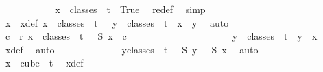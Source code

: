 \begin{isabellebody}
\isanewline
\ \ \ \ \ \ \ \ \isamarkupfalse%
\ \isamarkupfalse%
\ {\isachardoublequoteopen}{\isasymexists}{\isacharbang}{\kern0pt}x\ {\isasymin}\ classes\ {}\ t\ {}{\isachardot}{\kern0pt}\ True{\isachardoublequoteclose}\ \isamarkupfalse%
\ redef\ \isamarkupfalse%
\ simp\isanewline
\ \ \ \ \ \ \ \ \isamarkupfalse%
\ \isamarkupfalse%
\ x\ \ x{\isacharunderscore}{\kern0pt}def{\isacharcolon}{\kern0pt}\ {\isachardoublequoteopen}x\ {\isasymin}\ classes\ {}\ t\ {}\ {\isasymand}\ {\isacharparenleft}{\kern0pt}{\isasymforall}y\ {\isasymin}\ classes\ {}\ t\ {}{\isachardot}{\kern0pt}\ x\ {\isacharequal}{\kern0pt}\ y{\isacharparenright}{\kern0pt}{\isachardoublequoteclose}\ \isamarkupfalse%
\ auto\isanewline
\isanewline
\ \ \ \ \ \ \ \ \isamarkupfalse%
\ {\isachardoublequoteopen}{\isasymexists}c\ {\isacharless}{\kern0pt}\ r{\isachardot}{\kern0pt}\ {\isasymforall}x\ {\isasymin}\ classes\ {}\ t\ {}{\isachardot}{\kern0pt}\ {\isasymchi}\ {\isacharparenleft}{\kern0pt}S{}\ x{\isacharparenright}{\kern0pt}\ {\isacharequal}{\kern0pt}\ c{\isachardoublequoteclose}\ \isanewline
\ \ \ \ \ \ \ \ \isamarkupfalse%
{\isacharminus}{\kern0pt}\isanewline
\ \ \ \ \ \ \ \ \ \ \isamarkupfalse%
\ {\isachardoublequoteopen}{\isasymforall}y\ {\isasymin}\ classes\ {}\ t\ {}{\isachardot}{\kern0pt}\ y\ {\isacharequal}{\kern0pt}\ x{\isachardoublequoteclose}\ \isamarkupfalse%
\ x{\isacharunderscore}{\kern0pt}def\ \isamarkupfalse%
\ auto\isanewline
\ \ \ \ \ \ \ \ \ \ \isamarkupfalse%
\ \isamarkupfalse%
\ {\isachardoublequoteopen}{\isasymforall}y{\isasymin}classes\ {}\ t\ {}{\isachardot}{\kern0pt}\ {\isasymchi}\ {\isacharparenleft}{\kern0pt}S{}\ y{\isacharparenright}{\kern0pt}\ {\isacharequal}{\kern0pt}\ {\isasymchi}\ {\isacharparenleft}{\kern0pt}S{}\ x{\isacharparenright}{\kern0pt}{\isachardoublequoteclose}\ \isamarkupfalse%
\ auto\isanewline
\ \ \ \ \ \ \ \ \ \ \isamarkupfalse%
\ \isamarkupfalse%
\ {\isachardoublequoteopen}x\ {\isasymin}\ cube\ {}\ {\isacharparenleft}{\kern0pt}t{\isacharplus}{\kern0pt}{}{\isacharparenright}{\kern0pt}{\isachardoublequoteclose}\ \isamarkupfalse%
\ x{\isacharunderscore}{\kern0pt}def\ \ \isamarkupfalse%

\end{isabellebody}
